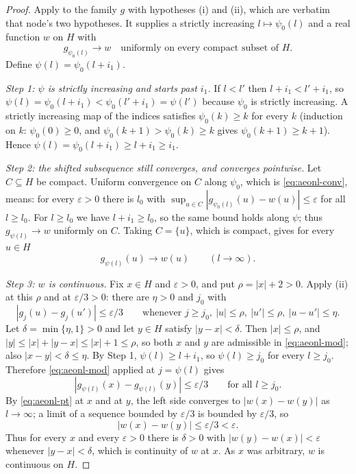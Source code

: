 \begin{proof}
Apply  to the family $g$ with hypotheses
(i) and (ii), which are verbatim that node's two hypotheses. It supplies a
strictly increasing $l\mapsto\psi_0(l)$ and a real function $w$ on $H$ with
\begin{equation}\label{eq:aeonl-conv}
  g_{\psi_0(l)}\to w\quad\text{uniformly on every compact subset of }H .
\end{equation}
Define $\psi(l)=\psi_0(l+i_1)$.

\emph{Step 1: $\psi$ is strictly increasing and starts past $i_1$.}
If $l<l'$ then $l+i_1<l'+i_1$, so $\psi(l)=\psi_0(l+i_1)<\psi_0(l'+i_1)=\psi(l')$
because $\psi_0$ is strictly increasing. A strictly increasing map of the indices
satisfies $\psi_0(k)\ge k$ for every $k$ (induction on $k$: $\psi_0(0)\ge0$, and
$\psi_0(k+1)>\psi_0(k)\ge k$ gives $\psi_0(k+1)\ge k+1$). Hence
$\psi(l)=\psi_0(l+i_1)\ge l+i_1\ge i_1$.

\emph{Step 2: the shifted subsequence still converges, and converges pointwise.}
Let $C\subseteq H$ be compact. Uniform convergence on $C$ along $\psi_0$, which is
\eqref{eq:aeonl-conv}, means:
for every $\varepsilon>0$ there is $l_0$ with
$\sup_{u\in C}|g_{\psi_0(l)}(u)-w(u)|\le\varepsilon$ for all $l\ge l_0$. For
$l\ge l_0$ we have $l+i_1\ge l_0$, so the same bound holds along $\psi$; thus
$g_{\psi(l)}\to w$ uniformly on $C$. Taking $C=\{u\}$, which is compact, gives for
every $u\in H$
\begin{equation}\label{eq:aeonl-pt}
  g_{\psi(l)}(u)\to w(u)\qquad(l\to\infty).
\end{equation}

\emph{Step 3: $w$ is continuous.}
Fix $x\in H$ and $\varepsilon>0$, and put $\rho=|x|+2>0$. Apply (ii) at this
$\rho$ and at $\varepsilon/3>0$: there are $\eta>0$ and $j_0$ with
\begin{equation}\label{eq:aeonl-mod}
  |g_j(u)-g_j(u')|\le\varepsilon/3
  \qquad\text{whenever } j\ge j_0,\ |u|\le\rho,\ |u'|\le\rho,\ |u-u'|\le\eta .
\end{equation}
Let $\delta=\min\{\eta,1\}>0$ and let $y\in H$ satisfy $|y-x|<\delta$. Then
$|x|\le\rho$, and $|y|\le|x|+|y-x|\le|x|+1\le\rho$, so both $x$ and $y$ are
admissible in \eqref{eq:aeonl-mod}; also $|x-y|<\delta\le\eta$. By Step 1,
$\psi(l)\ge l+i_1$, so $\psi(l)\ge j_0$ for every $l\ge j_0$. Therefore
\eqref{eq:aeonl-mod} applied at $j=\psi(l)$ gives
\[
  |g_{\psi(l)}(x)-g_{\psi(l)}(y)|\le\varepsilon/3\qquad\text{for all }l\ge j_0 .
\]
By \eqref{eq:aeonl-pt} at $x$ and at $y$, the left side converges to
$|w(x)-w(y)|$ as $l\to\infty$; a limit of a sequence bounded by $\varepsilon/3$
is bounded by $\varepsilon/3$, so
\[
  |w(x)-w(y)|\le\varepsilon/3<\varepsilon .
\]
Thus for every $x$ and every $\varepsilon>0$ there is $\delta>0$ with
$|w(y)-w(x)|<\varepsilon$ whenever $|y-x|<\delta$, which is continuity of $w$
at $x$. As $x$ was arbitrary, $w$ is continuous on $H$.


\end{proof}
